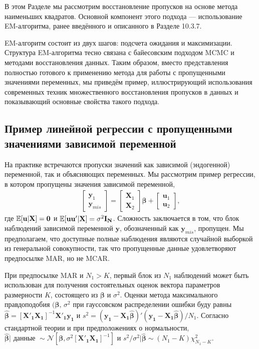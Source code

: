 В этом Разделе мы рассмотрим восстановление пропусков на основе метода наименьших квадратов. Основной компонент этого подхода --- использование EM-алгоритма, ранее введённого и описанного в Разделе 10.3.7. 

EM-алгоритм состоит из двух шагов: подсчета ожидания и максимизации. Структура EM-алгоритма тесно связана с байесовским подходом MCMC и методами восстановления данных. Таким образом, вместо представления полностью готового к применению метода для работы с пропущенными значениями переменных, мы приведём пример, иллюстрирующий использования современных техник множественного восстановления пропусков в данных и показывающий основные свойства такого подхода.

\subsection{Пример линейной регрессии с пропущенными значениями зависимой переменной} 

На практике встречаются пропуски значений как зависимой (эндогенной) переменной, так и объясняющих переменных. Мы рассмотрим пример регрессии, в котором пропущены значения зависимой переменной,
\begin{align}
\begin{bmatrix}
\mathbf{y}_1 \\ \mathbf{y}_{mis} 
\end{bmatrix} 
= 
\begin{bmatrix}
\mathbf{X}_1 \\ \mathbf{X}_2 
\end{bmatrix} 
\mathbf{\beta}
+
\begin{bmatrix}
\mathbf{u}_1 \\ \mathbf{u}_2 
\end{bmatrix}
,
\end{align}
где $\mathbb{E}[\mathbf{u|X}]= \mathbf{0}$ и $\mathbb{E}[\mathbf{uu'|X}]= \sigma^2\mathbf{I_N}$. Сложность заключается в том, что блок наблюдений зависимой переменной $\mathbf{y}$, обозначенный как $\mathbf{y}_{mis}$, пропущен. Мы предполагаем, что доступные полные наблюдения являются случайной выборкой из генеральной совокупности, так что пропущенные данные удовлетворяют предпосылке MAR, но не MCAR.

При предпосылке MAR и $N_1>K$, первый блок из $N_1$ наблюдений может быть использован для получения состоятельных оценок вектора параметров размерности $K$, состоящего из $\mathbf{\beta}$  и $\sigma^2$. Оценки метода максимального правдоподобия $(\mathbf{\beta}, \, \sigma^2$  при гауссовском распределении ошибки буду равны $\widehat{\mathbf{\beta}}=[\mathbf{X'_1 X_1}]^{-1}\mathbf{X'_1 y_1}$ и $s^2=(\mathbf{y_1-X_1}\widehat{\mathbf{\beta}})'(\mathbf{y_1-X_1}\widehat{\mathbf{\beta}})/N_1$. Согласно стандартной теории и при предположениях о нормальности, $\widehat{\mathbf{\beta}}|\text{ данные } \sim \mathcal{N}[\mathbf{\beta}, \sigma^2[\mathbf{X'_1 X_1}]^{-1}]$ и $s^2 / \sigma^2 | \widehat{\mathbf{\beta}} \sim (N_1-K)\chi^2_{N_1-K}$.

